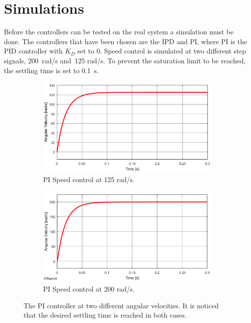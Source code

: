 \section{Simulations}
Before the controllers can be tested on the real system a simulation must be done. The controllers that have been chosen are the IPD and PI, where PI is the PID controller with $K_D$ set to 0. 
Speed control is simulated at two different step signals, 200~rad/s and~125 rad/s. 
To prevent the saturation limit to be reached, the settling time is set to 0.1~s.
\begin{figure}[h!]
	\centering
	\begin{subfigure}[b]{0.45\textwidth}
		\includegraphics[width=\textwidth]{graphics/PI_single125}
		\caption{PI Speed control at 125 rad/s.}
		\label{fig:pisingle125}
	\end{subfigure}
	\begin{subfigure}[b]{0.45\textwidth}
		\includegraphics[width=\textwidth]{graphics/PI_single200}
		\caption{PI Speed control at 200 rad/s.}
		\label{fig:pisingle200}
	\end{subfigure}
	\caption[The PI controller at two different angular velocities.]{The PI controller at two different angular velocities. It is noticed that the desired settling time is reached in both cases.}\label{fig:pisingle}
\end{figure}

